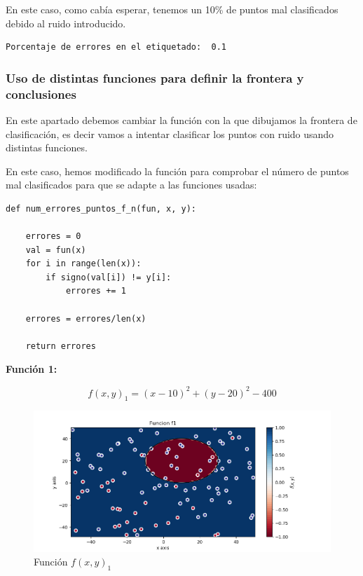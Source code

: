 \documentclass[12pt, spanish]{article}
\begin{document}
En este caso, como cabía esperar, tenemos un 10\% de puntos mal clasificados debido al ruido introducido.

\begin{lstlisting}
Porcentaje de errores en el etiquetado:  0.1
\end{lstlisting}



\subsubsection{Uso de distintas funciones para definir la frontera y conclusiones}

En este apartado debemos cambiar la función con la que dibujamos la frontera de clasificación, es decir vamos a intentar clasificar los puntos con ruido usando distintas funciones.

En este caso, hemos modificado la función para comprobar el número de puntos mal clasificados para que se adapte a las funciones usadas:

\begin{lstlisting}
def num_errores_puntos_f_n(fun, x, y):

	errores = 0
	val = fun(x)
	for i in range(len(x)):
		if signo(val[i]) != y[i]:
			errores += 1

	errores = errores/len(x)

	return errores
\end{lstlisting}

\newpage

\textbf{Función 1:} 

$$ f(x, y)_1 = (x - 10)^2 + (y - 20)^2 - 400  $$

\begin{figure}[H]
  \centering
      \includegraphics[scale = 0.70]{ej1-3-f1.png}
 		 \caption{Función $f(x, y)_1$}
  		\label{fig:ej1-f1}

\end{figure}
\end{document}
